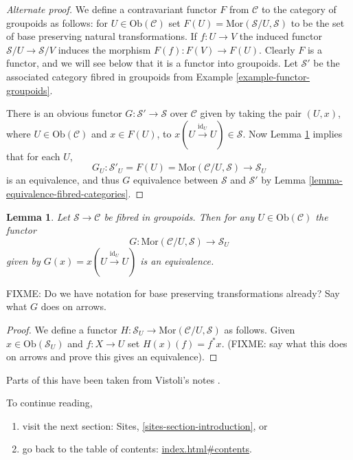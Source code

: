\documentclass{amsart}
\newtheorem{lemma}[theorem]{Lemma}
\theoremstyle{definition}
\theoremstyle{remark}
\numberwithin{equation}{subsection}
\begin{document}
\begin{proof}[Alternate proof]
We define a contravariant functor $F$ from $\mathcal{C}$ to the
category of groupoids as follows: for $U\in \text{Ob}(\mathcal{C})$
set $F(U) = \text{Mor}(\mathcal{S}/U,\mathcal{S})$ to be the set of
base preserving natural transformations.  If $f\colon U\to V$ the
induced functor $\mathcal{S}/U\to \mathcal{S}/V$ induces the
morphism $F(f)\colon F(V)\to F(U)$.  Clearly $F$ is a functor, and
we will see below that it is a functor into groupoids.  Let
$\mathcal{S}'$ be the associated category fibred in groupoids from Example
\ref{example-functor-groupoids}.

\smallskip\noindent
There is an obvious functor $G\colon \mathcal{S}'\to \mathcal{S}$
over $\mathcal{C}$ given by taking the pair $(U,x)$, where
$U\in\text{Ob}(\mathcal{C})$ and $x\in F(U)$, to
$x(U\stackrel{\text{id}_U}{\to} U) \in \mathcal{S}$.  Now Lemma
\ref{lemma-yoneda-2category} implies that for each $U$,
$$
G_U\colon \mathcal{S}'_U = F(U)= 
\text{Mor}(\mathcal{C}/U,\mathcal{S}) \to \mathcal{S}_U
$$
is an equivalence, and thus $G$ equivalence between $\mathcal{S}$ and
$\mathcal{S}'$ by Lemma \ref{lemma-equivalence-fibred-categories}.
\end{proof}

\begin{lemma}
\label{lemma-yoneda-2category}
Let $\mathcal{S}\to \mathcal{C}$ be fibred in groupoids.  Then for any
$U\in \text{Ob}(\mathcal{C})$ the functor
$$
G\colon \text{Mor}(\mathcal{C}/U,\mathcal{S}) \to \mathcal{S}_U
$$
given by $G(x) = x(U\stackrel{\text{id}_U}{\to} U)$ is an equivalence.
\end{lemma}

\noindent
FIXME: Do we have notation for base preserving transformations already?
Say what $G$ does on arrows.

\begin{proof}
We define a functor $H\colon \mathcal{S}_U \to
\text{Mor}(\mathcal{C}/U,\mathcal{S})$ as follows.  Given $x\in
\text{Ob}(\mathcal{S}_U)$ and $f\colon X\to U$ set $H(x)(f) = f^*x$.
(FIXME: say what this does on arrows and prove this gives an
equivalence).
\end{proof}
 
 Parts of this have been taken from
Vistoli's notes \cite{Vis2}.

\smallskip\noindent
To continue reading, 
\begin{enumerate}

\item visit the next section: Sites,
\autoref{sites-section-introduction}, or 

\item go back to the
table of contents: \url{index.html#contents}.

\end{enumerate}



\end{document}
